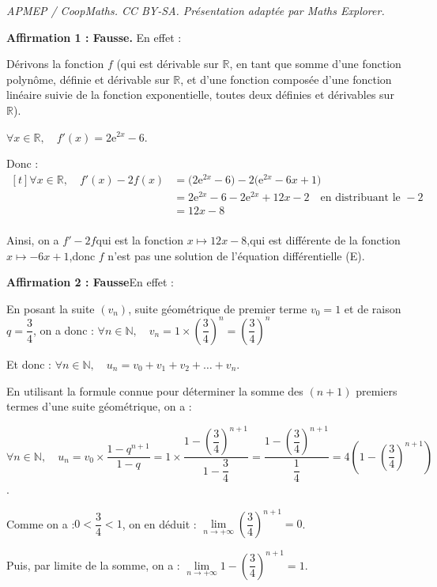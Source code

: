 \documentclass[10pt]{article}
\providecommand{\R}{\mathbb{R}}
\providecommand{\N}{\mathbb{N}}
\providecommand{\e}{{\mathrm{e}}}
\begin{document}
\noindent\textit{APMEP / CoopMaths. CC BY-SA. Présentation adaptée par Maths Explorer.}\par\medskip
\textbf{Affirmation 1 : Fausse.}\quad
En effet :

Dérivons la fonction $f$ (qui est dérivable sur $\R$, en tant que somme d'une fonction polynôme, définie et dérivable sur $\R$, et d'une fonction composée d'une fonction linéaire suivie de la fonction exponentielle, toutes deux définies et dérivables sur $\R$).

$\forall x \in \R,\quad f'(x) = 2\e^{2x} - 6$.

Donc :\quad $\begin{aligned}[t] \forall x\in \R,\quad f'(x) - 2f(x)
	&	= \big(2\e^{2x} - 6\big) - 2\big(\e^{2x} - 6x + 1\big)\\
	&	= 2\e^{2x} - 6 - 2\e^{2x} + 12x -2 \quad\text{en distribuant le }- 2\\
	&	= 12x -8\\	\end{aligned}$

Ainsi, on a \quad $f' - 2f$\quad qui est la fonction \quad $x \longmapsto 12x - 8$,\quad qui est différente de la fonction \quad $x \longmapsto -6x + 1$,\quad donc $f$ n'est pas une solution de l'équation différentielle (E).

\medskip

\textbf{Affirmation 2 : Fausse}\quad 	En effet :

En posant la suite $\left(v_n\right)$, suite géométrique de premier terme $v_0 = 1$ et de raison $q = \dfrac{3}{4}$, on a donc :\quad
	$\forall n \in \N, \quad v_n = 1\times \left(\dfrac{3}{4}\right)^n = \left(\dfrac{3}{4}\right)^n$

Et donc  : \quad $\forall n \in \N,\quad u_n = v_0 + v_1 + v_2 + \dots +v_n$.

En utilisant la formule connue pour déterminer la somme des $(n+1)$ premiers termes d'une suite géométrique, on a :

$\forall n \in \N,\quad u_n = v_0 \times \dfrac{1 - q^{n+1}}{1 - q} = 1\times \dfrac{1 - \left(\dfrac{3}{4}\right)^{n+1}}{1 - \dfrac{3}{4}} = \dfrac{1 - \left(\dfrac{3}{4}\right)^{n+1}}{\dfrac{1}{4}} = 4\left(1 - \left(\dfrac{3}{4}\right)^{n+1}\right)$.

Comme on a :\quad $0< \dfrac{3}{4} < 1$, \quad on en déduit : \quad$\lim\limits_{n \to +\infty} \left(\dfrac{3}{4}\right)^{n+1} = 0$.

Puis, par limite de la somme, on a : \quad$\lim\limits_{n \to +\infty} 1 - \left(\dfrac{3}{4}\right)^{n+1} = 1$.
\end{document}
